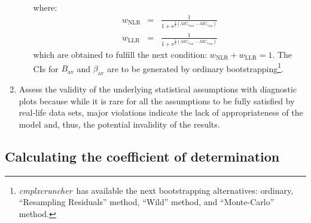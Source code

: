 \documentclass[12pt,oneside,letterpaper]{article}
\newcommand{\CC}[0]{\emph{cmplxcruncher}}
\begin{document}
\begin{enumerate}
\begin{itemize}
\begin{eqnarray*}
        \end{eqnarray*}
        where: 
        \begin{eqnarray*}
            w_\text{NLR} &=& \frac{1}{1+\mathrm{e}^{\frac{1}{2}\left(\mathrm{AIC_{c_{NLR}}}-\mathrm{AIC_{c_{LLR}}}\right)}} \\
            w_\text{LLR} &=& \frac{1}{1+\mathrm{e}^{\frac{1}{2}\left(\mathrm{AIC_{c_{LLR}}}-\mathrm{AIC_{c_{NLR}}}\right)}}
        \end{eqnarray*}
        which are obtained to fulfill the next condition: $w_\text{NLR} + w_\text{LLR} = 1$. The CIs for $B_\text{av}$ and $\beta_\text{av}$ are to be generated by ordinary bootstrapping\footnote{\CC\ has available the next bootstrapping alternatives\cite{boot}: ordinary, ``Resampling Residuals'' method, ``Wild'' method, and ``Monte-Carlo'' method.}.      
    \end{itemize}
    \item Assess the validity of the underlying statistical assumptions with diagnostic plots because while it is rare for all the assumptions to be fully satisfied by real-life data sets, major violations indicate the lack of appropriateness of the model and, thus, the potential invalidity of the results.
\end{enumerate}

\subsection{Calculating the coefficient of determination}
\end{document}
